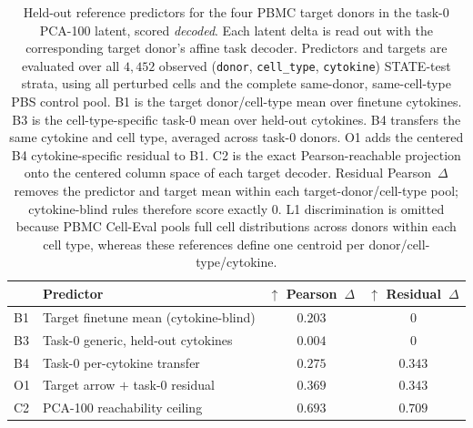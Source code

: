 \begin{table}[t]
\centering
\caption{Held-out reference predictors for the four PBMC target donors in the
task-0 PCA-100 latent, scored \emph{decoded}. Each latent delta is read out with
the corresponding target donor's affine task decoder. Predictors and targets
are evaluated over all $4{,}452$ observed
(\texttt{donor}, \texttt{cell\_type}, \texttt{cytokine}) STATE-test strata,
using all perturbed cells and the complete same-donor, same-cell-type PBS
control pool. B1 is the target donor/cell-type mean over finetune cytokines.
B3 is the cell-type-specific task-0 mean over held-out cytokines. B4 transfers
the same cytokine and cell type, averaged across task-0 donors. O1 adds the
centered B4 cytokine-specific residual to B1. C2 is the exact
Pearson-reachable projection onto the centered column space of each target
decoder. Residual Pearson~$\Delta$ removes the predictor and target mean
within each target-donor/cell-type pool; cytokine-blind rules therefore score
exactly $0$. L1 discrimination is omitted because PBMC Cell-Eval pools full
cell distributions across donors within each cell type, whereas these
references define one centroid per donor/cell-type/cytokine.}
\label{tab:pbmc_heldout_baselines_pca100}
\setlength{\tabcolsep}{6pt}
\begin{tabular}{llcc}
\toprule
 & Predictor & $\uparrow$ Pearson~$\Delta$
 & $\uparrow$ Residual~$\Delta$ \\
\midrule
B1 & Target finetune mean (cytokine-blind)
 & $0.203$ & $0$ \\
B3 & Task-0 generic, held-out cytokines
 & $0.004$ & $0$ \\
B4 & Task-0 per-cytokine transfer
 & $0.275$ & $0.343$ \\
O1 & Target arrow $+$ task-0 residual
 & $0.369$ & $0.343$ \\
C2 & PCA-100 reachability ceiling
 & $0.693$ & $0.709$ \\
\bottomrule
\end{tabular}
\end{table}
